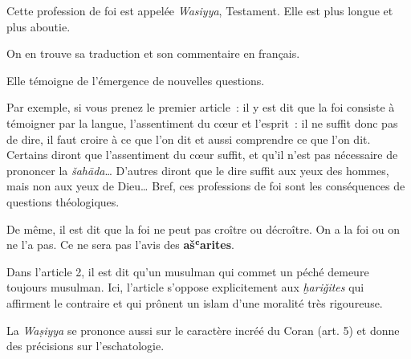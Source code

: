 
Cette profession de foi est appelée \emph{Wasiyya}, Testament. Elle est
plus longue et plus aboutie.



{On en trouve sa traduction et son
commentaire en français.
}

Elle témoigne de l'émergence de nouvelles questions.

Par exemple, si vous prenez le premier article~: il y est dit que la foi
consiste à témoigner par la langue, l'assentiment du cœur et l'esprit~:
il ne suffit donc pas de dire, il faut croire à ce que l'on dit et aussi
comprendre ce que l'on dit. Certains diront que l'assentiment du cœur
suffit, et qu'il n'est pas nécessaire de prononcer la
\emph{šahāda}\ldots{} D'autres diront que le dire suffit aux yeux des
hommes, mais non aux yeux de Dieu\ldots{} Bref, ces professions de foi
sont les conséquences de questions théologiques.

De même, il est dit que la foi ne peut pas croître ou décroître. On a la
foi ou on ne l'a pas. Ce ne sera pas l'avis des \textbf{ašʿarites}.

Dans l'article 2, il est dit qu'un musulman qui commet un péché demeure
toujours musulman. Ici, l'article s'oppose explicitement aux
\emph{ḫariǧites} qui affirment le contraire et qui prônent un islam
d'une moralité très rigoureuse.

La \emph{Waṣiyya} se prononce aussi sur le caractère incréé du Coran
(art. 5) et donne des précisions sur l'eschatologie.

